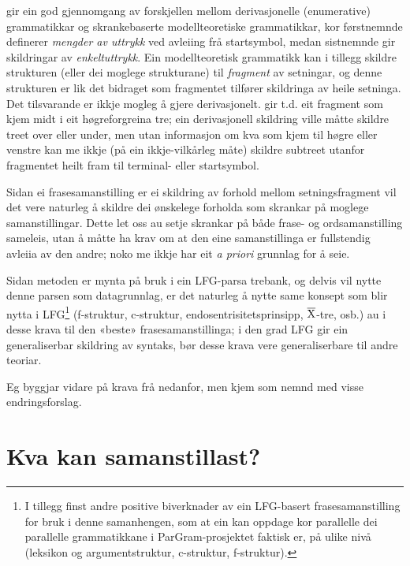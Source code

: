 \documentclass[11pt,a4paper,oneside,draft]{book}
\newcommand{\xbar}{$\rm\overline{X}$}
\begin{document}
\citet{pullum2001dbm} gir ein god gjennomgang av forskjellen
mellom derivasjonelle (enumerative) grammatikkar og skrankebaserte
modellteoretiske grammatikkar, kor førstnemnde definerer \emph{mengder av uttrykk} ved avleiing frå startsymbol, medan sistnemnde gir skildringar
av \emph{enkeltuttrykk}. Ein modellteoretisk grammatikk kan i tillegg skildre
strukturen (eller dei moglege strukturane) til \emph{fragment} av setningar,
og denne strukturen er lik det bidraget som fragmentet tilfører
skildringa av heile setninga. Det tilsvarande er ikkje mogleg å gjere
derivasjonelt. \citet[s.~32--33]{pullum2001dbm} gir t.d. eit fragment
som kjem midt i eit høgreforgreina tre; ein derivasjonell skildring
ville måtte skildre treet over eller under, men utan informasjon om
kva som kjem til høgre eller venstre kan me ikkje (på ein
ikkje-vilkårleg måte) skildre subtreet utanfor fragmentet heilt fram
til terminal- eller startsymbol. 

Sidan ei frasesamanstilling er ei skildring av forhold mellom
setningsfragment vil det vere naturleg å skildre dei ønskelege
forholda som skrankar på moglege samanstillingar. Dette let oss au
setje skrankar på både frase- og ordsamanstilling sameleis, utan å
måtte ha krav om at den eine samanstillinga er fullstendig avleiia av
den andre; noko me ikkje har eit \emph{a priori} grunnlag for å seie. 

Sidan metoden er mynta på bruk i ein LFG-parsa trebank, og delvis vil
nytte denne parsen som datagrunnlag, er det naturleg å nytte same
konsept som blir nytta i LFG\footnote{I tillegg finst andre positive biverknader av ein LFG-basert
 frasesamanstilling for bruk i denne samanhengen, som at ein kan
 oppdage kor parallelle dei parallelle grammatikkane i
 ParGram-prosjektet \citep{butt2002pgp} faktisk er, på ulike nivå
 (leksikon og argumentstruktur, c-struktur, f-struktur). } (f-struktur, c-struktur,
endosentrisitetsprinsipp, \xbar{}-tre, osb.)  au i desse krava til den
«beste» frasesamanstillinga; i den grad LFG gir ein generaliserbar
skildring av syntaks, bør desse krava vere generaliserbare til andre
teoriar.

Eg byggjar vidare på krava frå \citet{thunes2003eal} nedanfor, men
kjem som nemnd med visse endringsforslag.

\section{Kva kan samanstillast?}
\label{sec-3.5}
\end{document}
